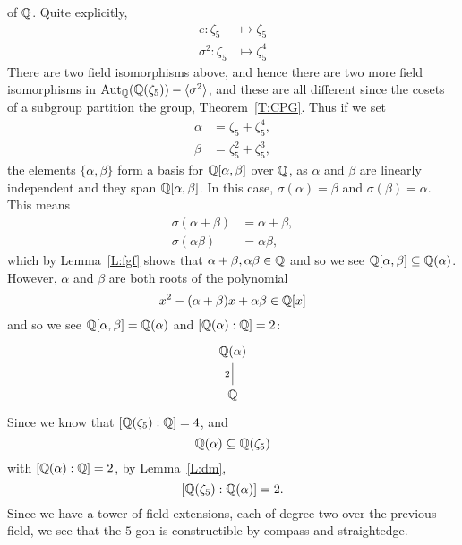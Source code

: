 \documentclass{ximera}
\begin{document}
\begin{example}
  of $\mathbb Q$. Quite explicitly,
  \begin{align*}
    e: \zeta_5 &\mapsto \zeta_5\\
    \sigma^2: \zeta_{5} &\mapsto \zeta_{5}^4
  \end{align*}
  There are two field isomorphisms above, and hence there are two more
  field isomorphisms in $\operatorname{Aut}_\mathbb Q(\mathbb Q(\zeta_{5})) - \langle \sigma^2\rangle$, and
  these are all different since the cosets of a subgroup partition the
  group, Theorem~\ref{T:CPG}. Thus if we set
  \begin{align*}
    \alpha &= \zeta_{5}   + \zeta_{5}^4,\\
    \beta &= \zeta_{5}^2 + \zeta_{5}^{3},
  \end{align*}
  the elements $\{\alpha,\beta\}$ form a basis for $\mathbb Q[\alpha,\beta]$
  over $\mathbb Q$, as $\alpha$ and $\beta$ are linearly independent and they
  span $\mathbb Q[\alpha,\beta]$. In this case, $\sigma(\alpha) = \beta$ and
  $\sigma(\beta) = \alpha$. This means
  \begin{align*}
    \sigma(\alpha+\beta) &= \alpha + \beta,\\
    \sigma(\alpha\beta) &= \alpha\beta,
  \end{align*}
  which by Lemma~\ref{L:fgf} shows that
  $\alpha+\beta,\alpha\beta\in\mathbb Q$ and so we see $\mathbb Q[\alpha,\beta]
  \subseteq \mathbb Q(\alpha)$. However, $\alpha$ and $\beta$ are both roots of
  the polynomial
  \[
  x^2 - (\alpha +\beta) x + \alpha\beta\in\mathbb Q[x]
  \]
  and so we see $\mathbb Q[\alpha,\beta]= \mathbb Q(\alpha)$ and $[\mathbb Q(\alpha):\mathbb Q] =
  2$:
  \[
  \begin{tikzcd}
    \Q(\alpha) \\ \Q \ar[u,-,"2"]
  \end{tikzcd}
  \]
  Since we know that $[\mathbb Q(\zeta_{5}):\mathbb Q] = 4$, and
  \[
  \mathbb Q(\alpha)\subseteq \mathbb Q(\zeta_{5})
  \]
  with $[\mathbb Q(\alpha):\mathbb Q]=2$, by Lemma~\ref{L:dm},
  \[
    [\mathbb Q(\zeta_{5}):\mathbb Q(\alpha)]=2.
  \]
  Since we have a tower of field extensions, each of degree two over
  the previous field, we see that the $5$-gon is constructible by
  compass and straightedge.
\end{example}
\end{document}
